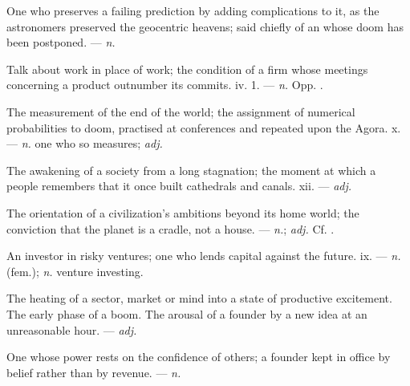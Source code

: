   One who preserves a failing prediction by adding complications to it, as the astronomers preserved the geocentric heavens; said chiefly of an  whose doom has been postponed. ---  \textit{n.}

 Talk about work in place of work; the condition of a firm whose meetings concerning a product outnumber its commits.   iv. 1. ---  \textit{n.} Opp. .

 The measurement of the end of the world; the assignment of numerical probabilities to doom, practised at conferences and repeated upon the Agora.   x. ---  \textit{n.} one who so measures;  \textit{adj.}

 The awakening of a society from a long stagnation; the moment at which a people remembers that it once built cathedrals and canals.   xii. ---  \textit{adj.}

 The orientation of a civilization's ambitions beyond its home world; the conviction that the planet is a cradle, not a house. ---  \textit{n.};  \textit{adj.} Cf. .

 An investor in risky ventures; one who lends capital against the future.   ix. ---  \textit{n.} (fem.);  \textit{n.} venture investing.

 The heating of a sector, market or mind into a state of productive excitement.  The early phase of a boom.  The arousal of a founder by a new idea at an unreasonable hour. ---  \textit{adj.}

 One whose power rests on the confidence of others; a founder kept in office by belief rather than by revenue. ---  \textit{n.} 

